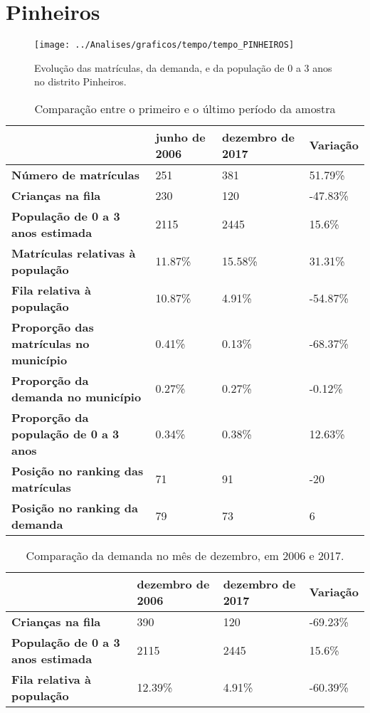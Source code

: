 \section{Pinheiros}
\begin{figure}[H]
\centering
\texttt{[image: ../Analises/graficos/tempo/tempo\_PINHEIROS]}
\caption{Evolução das matrículas, da demanda, e da população de 0 a 3 anos no distrito Pinheiros.}
\end{figure}
\begin{table}[H]
\begin{tabular}{|l|l|l|l|}
\hline
\textbf{}                                      & \textbf{junho de 2006}       & \textbf{dezembro de 2017}    & \textbf{Variação} \\ \hline
\textbf{Número de matrículas}                  & 251 & 381 & 51.79\% \\ \hline
\textbf{Crianças na fila}                      & 230 & 120 & -47.83\% \\ \hline
\textbf{População de 0 a 3 anos estimada}      & 2115 & 2445 & 15.6\% \\ \hline
\textbf{Matrículas relativas à população}      & 11.87\% & 15.58\% & 31.31\% \\ \hline
\textbf{Fila relativa à população}             & 10.87\% & 4.91\% & -54.87\% \\ \hline
\textbf{Proporção das matrículas no município} & 0.41\% & 0.13\% & -68.37\% \\ \hline
\textbf{Proporção da demanda no município}     & 0.27\% & 0.27\% & -0.12\% \\ \hline
\textbf{Proporção da população de 0 a 3 anos}  & 0.34\% & 0.38\% & 12.63\% \\ \hline
\textbf{Posição no ranking das matrículas}     & 71 & 91 & -20 \\ \hline
\textbf{Posição no ranking da demanda}         & 79 & 73 & 6 \\ \hline
\end{tabular}
\caption{Comparação entre o primeiro e o último período da amostra}
\end{table}
\begin{table}[H]
\begin{tabular}{|l|l|l|l|}
\hline
\textbf{}                                 & \textbf{dezembro de 2006} & \textbf{dezembro de 2017} & \textbf{Variação} \\ \hline
\textbf{Crianças na fila}                      & 390 & 120 & -69.23\% \\ \hline
\textbf{População de 0 a 3 anos estimada}      & 2115 & 2445 & 15.6\% \\ \hline
\textbf{Fila relativa à população}             & 12.39\% & 4.91\% & -60.39\% \\ \hline
\end{tabular}
\caption{Comparação da demanda no mês de dezembro, em 2006 e 2017.}
\end{table}
